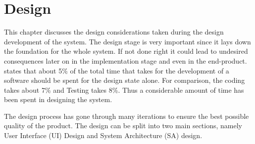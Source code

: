 \chapter{Design}
\label{Chapter:Design}

This chapter discusses the design considerations taken during the design development of the system. The design stage is very important since it lays down the foundation for the whole system. If not done right it could lead to undesired consequences later on in the implementation stage and even in the end-product. \citet[12]{bell2005} states that about 5\% of the total time that takes for the development of a software should be spent for the design state alone. For comparison, the coding takes about 7\% and Testing takes 8\%. Thus a considerable amount of time has been spent in designing the system. 

The design process has gone through many iterations to ensure the best possible quality of the product. The design can be split into two main sections, namely User Interface (UI) Design and System Architecture (SA) design.